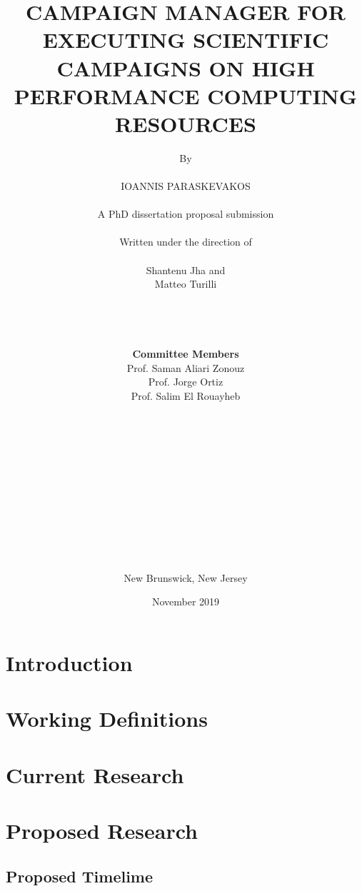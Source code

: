 

\title{CAMPAIGN MANAGER FOR EXECUTING SCIENTIFIC CAMPAIGNS ON HIGH PERFORMANCE COMPUTING RESOURCES}
\author{By\\\\IOANNIS PARASKEVAKOS\\\\A PhD dissertation proposal submission\\\\ Written under the direction of\\\\Shantenu Jha and \\Matteo Turilli\\\\\\\\\\\textbf{Committee Members}\\Prof. Saman Aliari Zonouz\\Prof. Jorge Ortiz\\Prof. Salim El Rouayheb\\\\\\\\\\\\\\\\\\\\\\\\\\New Brunswick, New Jersey}
\date{November 2019}

\maketitle
\newpage
{}



\section{Introduction}


\section{Working Definitions}


\section{Current Research}


\section{Proposed Research}

\label{sec:proposed}

\subsection{Proposed Timelime}





